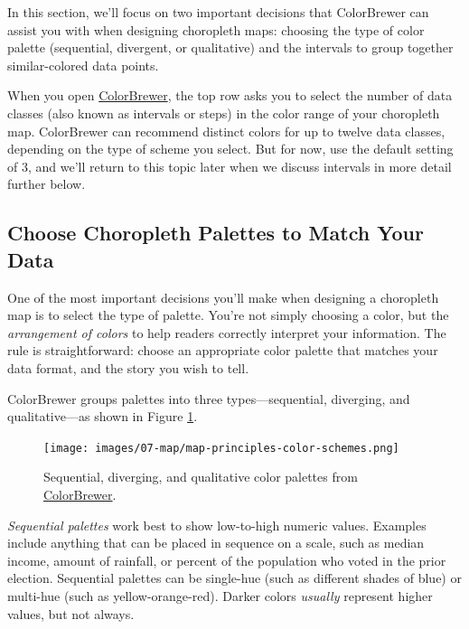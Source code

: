 \documentclass[
  english,
]{book}
\begin{document}
In this section, we'll focus on two important decisions that ColorBrewer can assist you with when designing choropleth maps: choosing the type of color palette (sequential, divergent, or qualitative) and the intervals to group together similar-colored data points.

When you open \href{https://colorbrewer2.org/}{ColorBrewer}, the top row asks you to select the number of data classes (also known as intervals or steps) in the color range of your choropleth map. ColorBrewer can recommend distinct colors for up to twelve data classes, depending on the type of scheme you select. But for now, use the default setting of 3, and we'll return to this topic later when we discuss intervals in more detail further below.

\hypertarget{choose-choropleth-palettes-to-match-your-data}{%
\subsection*{Choose Choropleth Palettes to Match Your Data}\label{choose-choropleth-palettes-to-match-your-data}}

One of the most important decisions you'll make when designing a choropleth map is to select the type of palette. You're not simply choosing a color, but the \emph{arrangement of colors} to help readers correctly interpret your information. The rule is straightforward: choose an appropriate color palette that matches your data format, and the story you wish to tell.

ColorBrewer groups palettes into three types---sequential, diverging, and qualitative---as shown in Figure \ref{fig:map-principles-color-schemes}.



\begin{figure}
\centering
\texttt{[image: images/07-map/map-principles-color-schemes.png]}
\caption{\label{fig:map-principles-color-schemes}Sequential, diverging, and qualitative color palettes from \href{https://colorbrewer2.org/}{ColorBrewer}.}
\end{figure}

\emph{Sequential palettes} work best to show low-to-high numeric values. Examples include anything that can be placed in sequence on a scale, such as median income, amount of rainfall, or percent of the population who voted in the prior election. Sequential palettes can be single-hue (such as different shades of blue) or multi-hue (such as yellow-orange-red). Darker colors \emph{usually} represent higher values, but not always.
\end{document}
